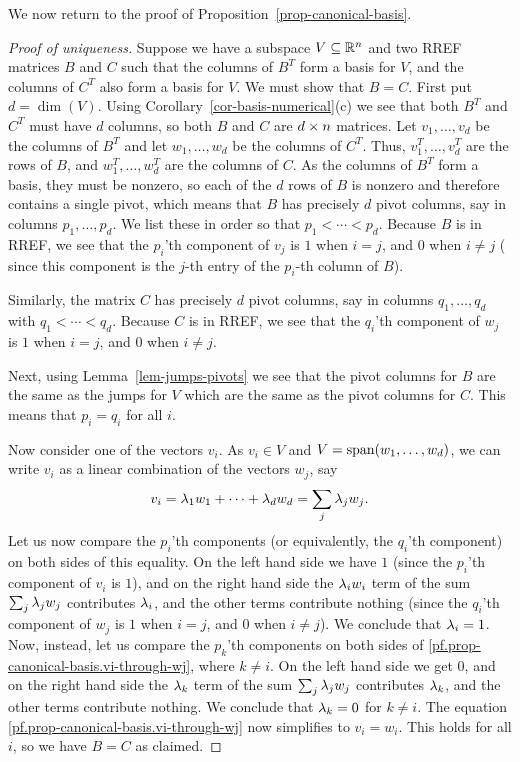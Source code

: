\documentclass[reqno]{amsart}
\theoremstyle{definition}
\begin{document}
We now return to the proof of Proposition~\ref{prop-canonical-basis}.
\begin{proof}[Proof of uniqueness]
 Suppose we have a subspace $V\subseteq{\mathbb{R}}^n$ and two RREF matrices $B$ and
 $C$ such that the columns of $B^T$ form a basis for $V$, and the
 columns of $C^T$ also form a basis for $V$.  We must show that $B=C$.
 First put $d=\dim(V)$.  Using Corollary~\ref{cor-basis-numerical}(c)
 we see that both $B^T$ and $C^T$ must have $d$ columns, so both $B$
 and $C$ are $d\times n$ matrices.  Let $v_1,\dotsc,v_d$ be the columns
 of $B^T$ and let $w_1,\dotsc,w_d$ be the columns of $C^T$.
 Thus, $v_1^T, \dotsc, v_d^T$ are the rows of $B$,
 and $w_1^T, \dots, w_d^T$ are the columns of $C$.
 As the columns of $B^T$ form a basis, they must be nonzero, so each
 of the $d$ rows of $B$ is nonzero and therefore contains a single
 pivot, which means that $B$ has precisely $d$ pivot columns, say
 in columns $p_1,\dotsc,p_d$.  We list these in order so that
 $p_1<\dotsb<p_d$.
 Because $B$ is in RREF, we see that the $p_i$'th component of $v_j$
 is $1$ when $i=j$, and $0$ when $i\neq j$
 (%
 since this component is the
 $j$-th entry of the $p_i$-th column of $B$).

 Similarly, the matrix $C$ has precisely $d$ pivot columns, say in
 columns $q_1,\dotsc,q_d$ with $q_1<\dotsb<q_d$.  Because $C$ is in
 RREF, we see that the $q_i$'th component of $w_j$ is $1$ when $i=j$,
 and $0$ when $i\neq j$.

 Next, using Lemma~\ref{lem-jumps-pivots} we see that the pivot
 columns for $B$ are the same as the jumps for $V$ which are the same
 as the pivot columns for $C$.  This means that $p_i=q_i$ for all $i$.

 Now consider one of the vectors $v_i$.  As $v_i\in V$ and
 $V=\operatorname{span}(w_1,\dotsc,w_d)$, we can write $v_i$ as a linear combination
 of the vectors $w_j$, say
 \begin{equation}
 v_i=\lambda_1w_1+\dotsb+\lambda_dw_d = \sum_j \lambda_j w_j .
 \label{pf.prop-canonical-basis.vi-through-wj}
 \end{equation}
 Let us now compare the $p_i$'th components (or equivalently, the $q_i$'th
 component) on both sides of this equality.
 On the left hand side we have $1$ (since the $p_i$'th
 component of $v_i$ is $1$), and on the right hand
 side the $\lambda_i w_i$ term of the sum $\sum_j \lambda_j w_j$ contributes
 $\lambda_i$, and the other terms contribute nothing (since the $q_i$'th
 component of $w_j$ is $1$ when $i=j$, and $0$ when $i\neq j$).
 We conclude that $\lambda_i=1$.  Now, instead, let us compare
 the $p_k$'th components on both sides of
 \eqref{pf.prop-canonical-basis.vi-through-wj}, where $k\neq i$.
 On the left hand side we get $0$, and on the right hand side the
 $\lambda_k$ term of the sum $\sum_j \lambda_j w_j$
 contributes $\lambda_k$, and the other terms contribute nothing.  We
 conclude that $\lambda_k = 0$ for $k\neq i$.  The equation
 \eqref{pf.prop-canonical-basis.vi-through-wj} now simplifies to
 $v_i = w_i$.  This holds for all $i$, so we have $B=C$ as claimed.
\end{proof}
\end{document}
